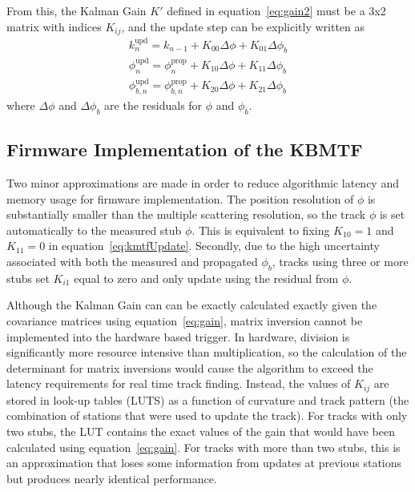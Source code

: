 From this, the Kalman Gain $K'$ defined in equation~\ref{eq:gain2} must be a 3x2 matrix with indices $K_{ij}$, and the update step can be explicitly written as
\begin{equation} \label{eq:kmtfUpdate}
	\begin{split}
		k_n^\mathrm{upd}=k_{n-1}+K_{00}\Delta\phi+K_{01}\Delta\phi_b \\
		\phi_n^\mathrm{upd}=\phi_n^\mathrm{prop}+K_{10}\Delta\phi+K_{11}\Delta\phi_b \\
		\phi_{b,n}^\mathrm{upd}=\phi_{b,n}^\mathrm{prop}+K_{20}\Delta\phi+K_{21}\Delta\phi_b
	\end{split}
\end{equation}
where $\Delta\phi$ and $\Delta\phi_b$ are the residuals for $\phi$ and $\phi_b$.

\subsection{Firmware Implementation of the KBMTF} \label{sec:fw}

Two minor approximations are made in order to reduce algorithmic latency and memory usage for firmware implementation. The position resolution of $\phi$ is substantially smaller than the multiple scattering resolution, so the track $\phi$ is set automatically to the measured stub $\phi$. This is equivalent to fixing $K_{10}=1$ and $K_{11}=0$ in equation~\ref{eq:kmtfUpdate}. Secondly, due to the high uncertainty associated with both the measured and propagated $\phi_b$, tracks using three or more stubs set $K_{i1}$ equal to zero and only update using the residual from $\phi$. 

Although the Kalman Gain can can be exactly calculated exactly given the covariance matrices using equation~\ref{eq:gain}, matrix inversion cannot be implemented into the hardware based trigger. In hardware, division is significantly more resource intensive than multiplication, so the calculation of the determinant for matrix inversions would cause the algorithm to exceed the latency requirements for real time track finding. Instead, the values of $K_{ij}$ are stored in look-up tables (LUTS) as a function of curvature and track pattern (the combination of stations that were used to update the track). For tracks with only two stubs, the LUT contains the exact values of the gain that would have been calculated using equation~\ref{eq:gain}. For tracks with more than two stubs, this is an approximation that loses some information from updates at previous stations but produces nearly identical performance.

